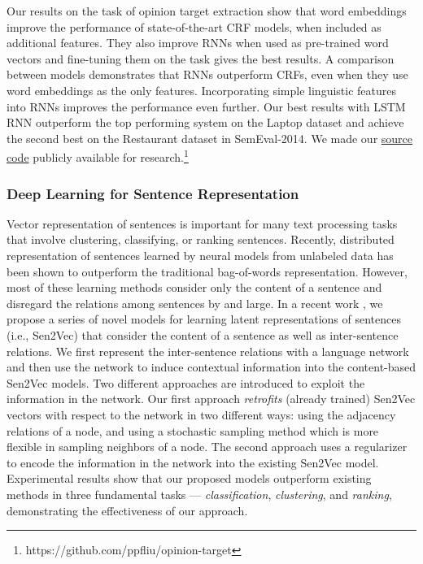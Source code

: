 \documentclass{article} %
\begin{document}
Our results on the task of opinion target extraction show that word embeddings improve the performance of state-of-the-art CRF models, when included as additional features. They also improve RNNs when used as pre-trained word vectors and fine-tuning them on the task gives the best results. A comparison between models demonstrates that RNNs outperform CRFs, even when they use word embeddings as the only features. Incorporating simple linguistic features into RNNs improves the performance even further. Our best results with LSTM RNN outperform the top performing system on the Laptop dataset and achieve the second best on the Restaurant dataset in SemEval-2014. We made our \href{https://github.com/ppfliu/opinion-target} {source code} publicly available for research.\footnote{https://github.com/ppfliu/opinion-target}


\subsubsection{Deep Learning for Sentence Representation}

Vector representation of sentences is important for many text processing tasks that involve clustering, classifying, or ranking sentences. Recently, distributed representation of sentences learned by neural models from unlabeled data has been shown to outperform the traditional bag-of-words representation. However, most of these learning methods  consider only the content of a sentence and disregard the relations among sentences by and large.  In a recent work \cite{Tanay_WWW_17}, we propose a series of novel models for learning latent representations of sentences (i.e., Sen2Vec) that consider the content of a sentence as well as inter-sentence relations. We first represent the inter-sentence relations with a language network and then use the network to induce contextual information into the content-based Sen2Vec models. Two different approaches are introduced to exploit the information in the network.  Our first approach \emph{retrofits} (already trained) Sen2Vec vectors with respect to the network in two different ways: \Ni using the adjacency relations of a node, and \Nii using a stochastic sampling method which is more flexible in sampling neighbors of a node. The second approach uses a regularizer to encode the information in the network into the existing Sen2Vec model. Experimental results show that our proposed models outperform existing methods in three fundamental tasks --- \emph{classification}, \emph{clustering}, and \emph{ranking}, demonstrating the effectiveness of our approach. 
\end{document}
